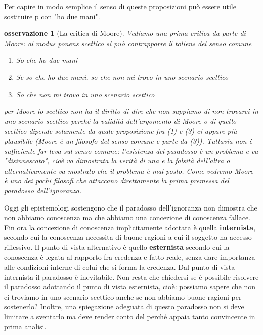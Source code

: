 \documentclass[10pt,a4paper]{article}
\newtheorem{osservazione}{osservazione}
\begin{document}
Per capire in modo semplice il senso di queste proposizioni può essere utile sostituire p con "ho due mani". 
\begin{osservazione}[La critica di Moore]
	Vediamo una prima critica da parte di Moore: al modus ponens scettico si può contrapporre il tollens del senso comune
	\begin{enumerate}
		\item So che ho due mani
		\item Se so che ho due mani, so che non mi trovo in uno scenario scettico
		\item So che non mi trovo in uno scenario scettico
	\end{enumerate}
	per Moore lo scettico non ha il diritto di dire che non sappiamo di non trovarci in uno scenario scettico perché la validità dell'argomento di Moore o di quello scettico dipende solamente da quale proposizione fra (1) e (3) ci appare più plausibile (Moore è un filosofo del senso comune e parte da (3)). Tuttavia non è sufficiente far leva sul senso comune: l'esistenza del paradosso è un problema e va "disinnescato", cioè va dimostrata la verità di una e la falsità dell'altra o alternativamente va mostrato che il problema è mal posto. Come vedremo Moore è uno dei pochi filosofi che attaccano direttamente la prima premessa del paradosso dell'ignoranza.
\end{osservazione}
 Oggi gli epistemologi sostengono che il paradosso dell'ignoranza non dimostra che non abbiamo conoscenza ma che abbiamo una concezione di conoscenza fallace. Fin ora la concezione di conoscenza implicitamente adottata è quella \textbf{internista}, secondo cui la conoscenza necessita di buone ragioni a cui il soggetto ha accesso riflessivo. Il punto di vista alternativo è quello \textbf{esternista} secondo cui la conoscenza è legata al rapporto fra credenza e fatto reale, senza dare importanza alle condizioni interne di colui che si forma la credenza. Dal punto di vista internista il paradosso è inevitabile. Non resta che chiedersi se è possibile risolvere il paradosso adottando il punto di vista esternista, cioè: possiamo sapere che non ci troviamo in uno scenario scettico anche se non abbiamo buone ragioni per sostenerlo? Inoltre, una spiegazione adeguata di questo paradosso non si deve limitare a sventarlo ma deve render conto del perché appaia tanto convincente in prima analisi.
\end{document}
